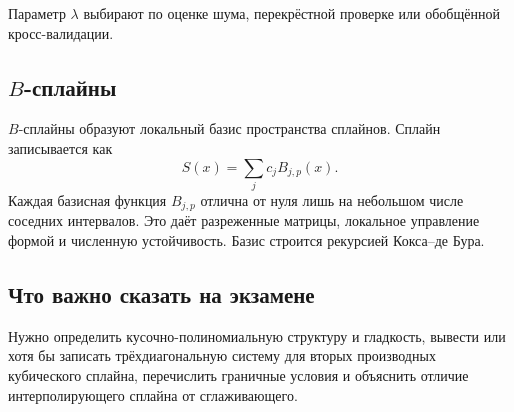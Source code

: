 Параметр $\lambda$ выбирают по оценке шума, перекрёстной проверке или обобщённой
кросс-валидации.

\subsection{$B$-сплайны}

$B$-сплайны образуют локальный базис пространства сплайнов. Сплайн записывается
как
\[
    S(x)=\sum_j c_jB_{j,p}(x).
\]
Каждая базисная функция $B_{j,p}$ отлична от нуля лишь на небольшом числе
соседних интервалов. Это даёт разреженные матрицы, локальное управление формой и
численную устойчивость. Базис строится рекурсией Кокса--де Бура.

\subsection{Что важно сказать на экзамене}

Нужно определить кусочно-полиномиальную структуру и гладкость, вывести или хотя
бы записать трёхдиагональную систему для вторых производных кубического сплайна,
перечислить граничные условия и объяснить отличие интерполирующего сплайна от
сглаживающего.

\newpage